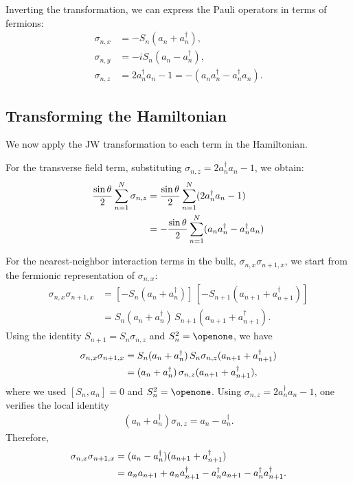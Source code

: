 \documentclass[aps,prx,twocolumn,superscriptaddress,nofootinbib,nolongbibliography,nobalancelastpage,10pt,floatfix]{revtex4-2}
\begin{document}
Inverting the transformation, we can express the Pauli operators in terms of fermions:
\begin{align}
    \sigma_{n,x} &= -S_n(a_n + a_n^\dag),\\
    \sigma_{n,y} &= -iS_n(a_n - a_n^\dag),\\
    \sigma_{n,z} &= 2a_n^\dag a_n - 1 = -(a_n a_n^\dag - a_n^\dag a_n).
\end{align}


\subsection{Transforming the Hamiltonian}

We now apply the JW transformation to each term in the Hamiltonian.

For the transverse field term, substituting $\sigma_{n,z} = 2a_n^\dag a_n - 1$, we obtain:
\begin{align}
    \frac{\sin\theta}{2} \sum_{n=1}^N \sigma_{n,z}
     &= \frac{\sin\theta}{2} \sum_{n=1}^N (2a_n^\dag a_n - 1) \nonumber\\
     &= -\frac{\sin\theta}{2} \sum_{n=1}^N (a_n a_n^\dag - a_n^\dag a_n)
\end{align}


For the nearest-neighbor interaction terms in the bulk, $\sigma_{n,x}\sigma_{n+1,x}$, we start from the fermionic representation of $\sigma_{n,x}$:
\begin{align}
    \sigma_{n,x}\sigma_{n+1,x} &= [-S_n(a_n+a_n^\dag)]\,[-S_{n+1}(a_{n+1}+a_{n+1}^\dag)]\\
                               &= S_n(a_n+a_n^\dag)\,S_{n+1}(a_{n+1}+a_{n+1}^\dag).
\end{align}
Using the identity $S_{n+1}=S_n \sigma_{n,z}$ and $S_n^2=\Id$, we have
\begin{align}
    \sigma_{n,x}\sigma_{n+1,x}
    &= S_n(a_n+a_n^\dag)\,S_n \sigma_{n,z}(a_{n+1}+a_{n+1}^\dag)\nonumber\\
    &= (a_n+a_n^\dag)\,\sigma_{n,z}(a_{n+1}+a_{n+1}^\dag),
\end{align}
where we used $[S_n,a_n]=0$ and $S_n^2=\Id$.
Using $\sigma_{n,z}=2a_n^\dag a_n - 1$, one verifies the local identity
\begin{align}
    (a_n+a_n^\dag)\sigma_{n,z} = a_n - a_n^\dag.
\end{align}
Therefore,
\begin{align}
    \sigma_{n,x}\sigma_{n+1,x}
    &= (a_n - a_n^\dag)(a_{n+1}+a_{n+1}^\dag)\nonumber\\
    &= a_n a_{n+1} + a_n a_{n+1}^\dag - a_n^\dag a_{n+1} - a_n^\dag a_{n+1}^\dag.
\end{align}
\end{document}
